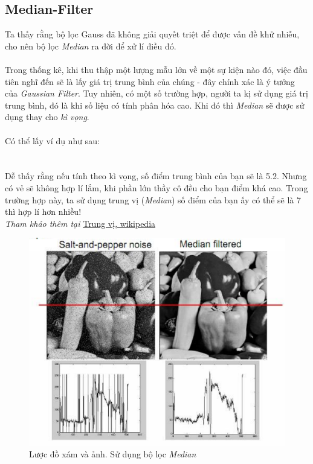 \documentclass{article}
\begin{document}
    \subsection{Median-Filter}
    Ta thấy rằng bộ lọc Gauss đã không giải quyết triệt để được vấn đề khử nhiễu, cho nên bộ lọc \textit{Median} ra đời để xử lí điều đó.
    \\ \\ Trong thống kê, khi thu thập một lượng mẫu lớn về một sự kiện nào đó, việc đầu tiên nghĩ đến sẽ là lấy giá trị trung bình của chúng - đây chính xác là ý tưởng của \textit{Gaussian Filter}. Tuy nhiên, có một số trường hợp, người ta kị sử dụng giá trị trung bình, đó là khi số liệu có tính phân hóa cao. Khi đó thì \textit{Median} sẽ được sử dụng thay cho \textit{kì vọng}. \\ \\
    Có thể lấy ví dụ như sau:\\
    \\ \\Dễ thấy rằng nếu tính theo kì vọng, số điểm trung bình của bạn sẽ là 5.2. Nhưng có vẻ sẽ không hợp lí lắm, khi phần lớn thầy cô đều cho bạn điểm khá cao. Trong trường hợp này, ta sử dụng trung vị (\textit{Median}) số điểm của bạn ấy có thể sẽ là 7 thì hợp lí hơn nhiều!    \\
    \textit{Tham khảo thêm tại} \href{https://vi.wikipedia.org/wiki/S%E1%BB%91_trung_v%E1%BB%8B}{Trung vị, wikipedia}
    \begin{figure}[ht!]
        \centering
        \includegraphics[width = 0.6\linewidth]{median.png}
        \caption{Lược đồ xám và ảnh. Sử dụng bộ lọc \textit{Median}}
        \label{fig11}
    \end{figure} \\  \\
\end{document}
